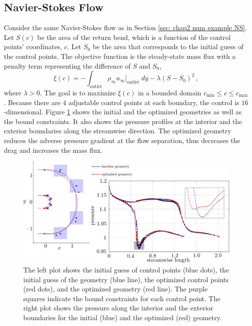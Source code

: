 \subsection{Navier-Stokes Flow}
Consider the same Navier-Stokes flow as in Section 
\ref{sec: chap2 num example NS}.
Let $S(c)$ be the area of the return bend, which is a function of the 
control points' coordinates, $c$. Let $S_0$ be the area that corresponds to
the initial guess of the control points. 
The objective function is the steady-state mass flux with a penalty term representing the difference 
of $S$ and $S_0$,
\begin{equation}
    \xi(c) = - \int_{\textrm{outlet}} \rho_\infty u_\infty \big|_{\textrm{outlet}} \; dy
    - \lambda (S-S_0)^2\,,
    \label{eqn: mass flux 2}
\end{equation}
where $\lambda>0$. The goal is to maximize $\xi(c)$ in a bounded domain
$c_{\min}\le c\le c_{\max}$. 
Because there are $4$ adjustable control points at each boundary, the
control is $16$-dimensional.
Figure \ref{fig: NS opt geo combined} shows
the initial and the optimized geometries as well as the bound constraints.
It also shows the pressure profiles at the interior and the exterior boundaries along
the streamwise direction. The optimized geometry reduces the adverse pressure
gradient at the flow separation, thus decreases the drag and increases the
mass flux.\\

\begin{figure}[htbp]\begin{center}
    \includegraphics[width=14.4cm]{../Ubend_combined_new.png}
    \caption{The left plot shows the initial guess of control points (blue dots), 
             the initial guess of the geometry (blue line),
             the optimized control points (red dots), and the optimized
             geometry (red line). The purple squares indicate the bound 
             constraints for each control point. The right plot shows the 
             pressure along the interior and the exterior boundaries for
             the initial (blue) and the optimized (red) geometry.}
    \label{fig: NS opt geo combined}
\end{center}\end{figure}

